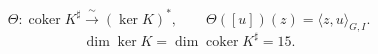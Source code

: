 \begin{equation}
\Theta:\operatorname{coker}K^\sharp\xrightarrow{\ \sim\ }(\ker K)^*,
\qquad \Theta([u])(z)=\langle z,u\rangle_{G,I}.
\end{equation}
\[\dim\ker K=\dim\operatorname{coker}K^\sharp=15.\]
